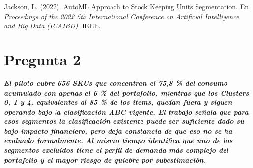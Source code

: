\documentclass[10pt,a4paper]{article}
\begin{document}
\renewcommand{\refname}{Referencias pregunta 1}
\begin{thebibliography}{}

    Jackson, L. (2022).
    AutoML Approach to Stock Keeping Units Segmentation.
    En \textit{Proceedings of the 2022 5th International Conference on Artificial Intelligence and Big Data (ICAIBD)}. IEEE.


\end{thebibliography}
\newpage
\section*{Pregunta 2}
\label{sec:pregunta}
\textbf{\textit{El piloto cubre 656 SKUs que concentran el 75,8 \% del consumo acumulado con apenas el 6 \% del portafolio, mientras que los Clusters 0, 1 y 4, equivalentes al 85 \% de los ítems, quedan fuera y siguen operando bajo la clasificación ABC vigente. El trabajo señala que para esos segmentos la clasificación existente puede ser suficiente dado su bajo impacto financiero, pero deja constancia de que eso no se ha evaluado formalmente. Al mismo tiempo identifica que uno de los segmentos excluidos tiene el perfil de demanda más complejo del portafolio y el mayor riesgo de quiebre por subestimación.}}
\end{document}
